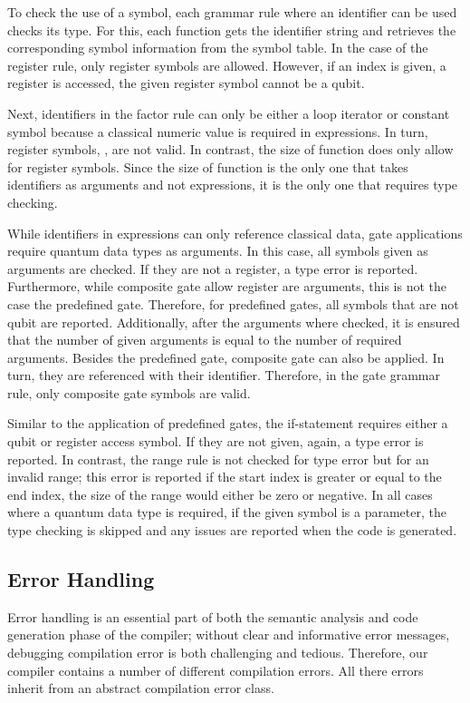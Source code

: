 To check the use of a symbol, each grammar rule where an identifier can be used checks its type. For this, each function gets the identifier string and retrieves the corresponding symbol information from the symbol table. In the case of the register rule, only register symbols are allowed. However, if an index is given, \ie a register is accessed, the given register symbol cannot be a qubit. 

Next, identifiers in the factor rule can only be either a loop iterator or constant symbol because a classical numeric value is required in expressions. In turn, register symbols, \eg, are not valid. In contrast, the size of function does only allow for register symbols. Since the size of function is the only one that takes identifiers as arguments and not expressions, it is the only one that requires type checking.

While identifiers in expressions can only reference classical data, gate applications require quantum data types as arguments. In this case, all symbols given as arguments are checked. If they are not a register, a type error is reported. Furthermore, while composite gate allow register are arguments, this is not the case the predefined gate. Therefore, for predefined gates, all symbols that are not qubit are reported. Additionally, after the arguments where checked, it is ensured that the number of given arguments is equal to the number of required arguments. Besides the predefined gate, composite gate can also be applied. In turn, they are referenced with their identifier. Therefore, in the gate grammar rule, only composite gate symbols are valid. 

Similar to the application of predefined gates, the if-statement requires either a qubit or register access symbol. If they are not given, again, a type error is reported. In contrast, the range rule is not checked for type error but for an invalid range; this error is reported if the start index is greater or equal to the end index, \ie the size of the range would either be zero or negative. 
In all cases where a quantum data type is required, 
if the given symbol is a parameter, the type checking is skipped and any issues are reported when the code is generated.

\subsection{Error Handling}
\label{sec:implementation_semanticAnalayis_errorHandling}
Error handling is an essential part of both the semantic analysis and code generation phase of the compiler; without clear and informative error messages, debugging compilation error is both challenging and tedious. Therefore, our compiler contains a number of different compilation errors. All there errors inherit from an abstract compilation error class. 

